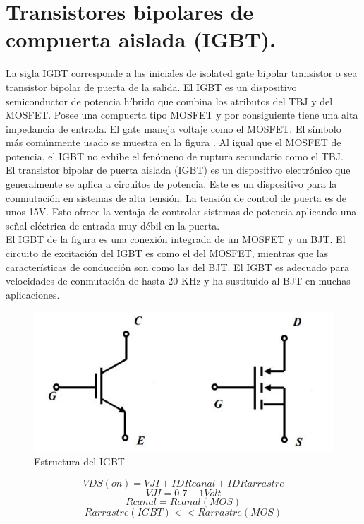 \documentclass[10pt,a4paper]{article}
\begin{document}
\section{Transistores bipolares de compuerta aislada  (IGBT).}
La sigla IGBT corresponde a las iniciales de isolated gate bipolar transistor o sea transistor bipolar de puerta de la salida. El IGBT es un dispositivo semiconductor de potencia híbrido que combina los atributos del TBJ y del MOSFET. Posee una compuerta tipo MOSFET y por consiguiente tiene una alta impedancia de entrada. El gate maneja voltaje como el MOSFET. El símbolo más comúnmente usado se muestra en la figura . Al igual que el MOSFET de potencia, el IGBT no exhibe el fenómeno de ruptura secundario como el TBJ.\\
El transistor bipolar de puerta aislada (IGBT) es un dispositivo electrónico que generalmente se aplica a circuitos de potencia. Este es un dispositivo para la conmutación en sistemas de alta tensión. La tensión de control de puerta es de unos 15V. Esto ofrece la ventaja de controlar sistemas de potencia aplicando una señal eléctrica de entrada muy débil en la puerta.\\
El IGBT de la figura es una conexión integrada de un MOSFET y un BJT. El circuito de excitación del IGBT es como el del MOSFET, mientras que las características de conducción son como las del BJT. El IGBT es adecuado para velocidades de conmutación de hasta 20 KHz y ha sustituido al BJT en muchas aplicaciones.\\
\begin{figure}[hbtp]
\centering
\includegraphics[scale=0.5]{imagenes/igbt.jpg}
\caption{Estructura del IGBT}
\end{figure}

\begin{equation}
VDS(on) =  VJI + IDR canal + IDR arrastre
\end{equation}
\begin{equation}
VJI = 0.7 + 1Volt
\end{equation}
\begin{equation}
R canal = R canal(MOS)
\end{equation}
\begin{equation}
R arrastre(IGBT) << R arrastre (MOS)
\end{equation}
\end{document}
